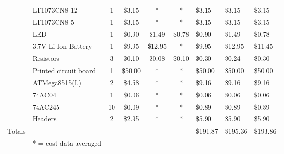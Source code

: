 \begin{table}[htb!]
\begin{center}
\begin{tabular}{p{1.5cm}|p{2cm}cccc|p{1cm}p{1cm}p{1cm}}
\cite{web:lintech-price} & LT1073CN8-12 &          1 &     \$3.15 &          * &          * &     \$3.15 &     \$3.15 &     \$3.15 \\

\cite{web:lintech-price} & LT1073CN8-5 &          1 &     \$3.15 &          * &          * &     \$3.15 &     \$3.15 &     \$3.15 \\

\cite{web:mouser-price, web:resistor-price, web:digikey-price} &        LED &          1 &     \$0.90 &     \$1.49 &     \$0.78 &     \$0.90 &     \$1.49 &     \$0.78 \\

\cite{web:batt-price, web:batt-price2} & 3.7V Li-Ion Battery &          1 &     \$9.95 &    \$12.95 &          * &     \$9.95 &    \$12.95 &    \$11.45 \\

\cite{web:jameco-price, web:digikey-price, web:newark-price} &  Resistors &          3 &     \$0.10 &     \$0.08 &     \$0.10 &     \$0.30 &     \$0.24 &     \$0.30 \\
\hline
\cite{web:batchpcb} & Printed circuit board &          1 &    \$50.00 &          * &          * &    \$50.00 &    \$50.00 &    \$50.00 \\

\cite{web:jameco_atmel} & ATMega8515(L) &          2 &     \$4.58 &          * &          * &     \$9.16 &     \$9.16 &     \$9.16 \\

\cite{web:jameco_inv} &     74AC04 &          1 &     \$0.06 &          * &          * &     \$0.06 &     \$0.06 &     \$0.06 \\

\cite{web:jameco_inv} &    74AC245 &         10 &     \$0.09 &          * &          * &     \$0.89 &     \$0.89 &     \$0.89 \\

\cite{web:sparkfun} &    Headers &          2 &     \$2.95 &          * &          * &     \$5.90 &     \$5.90 &     \$5.90 \\
\hline
Totals &            &            &            &            &            &   \$191.87 &   \$195.36 &   \$193.86 \\
\hline
  &   * = cost data averaged         &            &            &            &            &            &            &            \\

\end{tabular}  
\end{center}
\label{tab:cost_est}
\end{table}